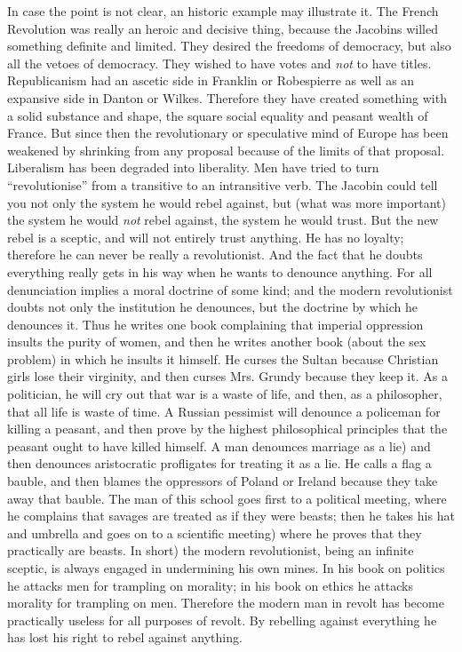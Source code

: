 \documentclass{book}
\begin{document}
In case the point is not clear, an historic example may illustrate it. The French Revolution was really an heroic and decisive thing, because the Jacobins willed something definite and limited. They desired the freedoms of democracy, but also all the vetoes of democracy. They wished to have votes and \emph{not} to have titles. Republicanism had an ascetic side in Franklin or Robespierre as well as an expansive side in Danton or Wilkes. Therefore they have created something with a solid substance and shape, the square social equality and peasant wealth of France. But since then the revolutionary or speculative mind of Europe has been weakened by shrinking from any proposal because of the limits of that proposal. Liberalism has been degraded into liberality. Men have tried to turn “revolutionise” from a transitive to an intransitive verb. The Jacobin could tell you not only the system he would rebel against, but (what was more important) the system he would \emph{not} rebel against, the system he would trust. But the new rebel is a sceptic, and will not entirely trust anything. He has no loyalty; therefore he can never be really a revolutionist. And the fact that he doubts everything really gets in his way when he wants to denounce anything. For all denunciation implies a moral doctrine of some kind; and the modern revolutionist doubts not only the institution he denounces, but the doctrine by which he denounces it. Thus he writes one book complaining that imperial oppression insults the purity of women, and then he writes another book (about the sex problem) in which he insults it himself. He curses the Sultan because Christian girls lose their virginity, and then curses Mrs. Grundy because they keep it. As a politician, he will cry out that war is a waste of life, and then, as a philosopher, that all life is waste of time. A Russian pessimist will denounce a policeman for killing a peasant, and then prove by the highest philosophical principles that the peasant ought to have killed himself. A man denounces marriage as a lie) and then denounces aristocratic profligates for treating it as a lie. He calls a flag a bauble, and then blames the oppressors of Poland or Ireland because they take away that bauble. The man of this school goes first to a political meeting, where he complains that savages are treated as if they were beasts; then he takes his hat and umbrella and goes on to a scientific meeting) where he proves that they practically are beasts. In short) the modern revolutionist, being an infinite sceptic, is always engaged in undermining his own mines. In his book on politics he attacks men for trampling on morality; in his book on ethics he attacks morality for trampling on men. Therefore the modern man in revolt has become practically useless for all purposes of revolt. By rebelling against everything he has lost his right to rebel against anything.
\end{document}

